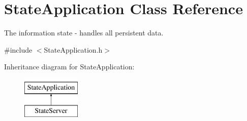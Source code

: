 \hypertarget{class_state_application}{\section{State\-Application Class Reference}
\label{class_state_application}
}


The information state -\/ handles all persistent data.  




{\ttfamily \#include $<$State\-Application.\-h$>$}

Inheritance diagram for State\-Application\-:\begin{figure}[H]
\begin{center}
\leavevmode
\includegraphics[height=2.000000cm]{class_state_application}
\end{center}
\end{figure}
